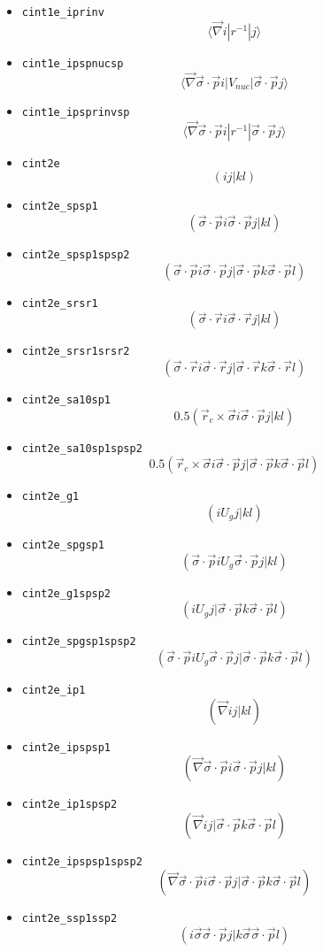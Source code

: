 \documentclass{article}
\begin{document}
\begin{itemize}
\begin{itemize}
  \item
    \verb!cint1e_iprinv! \[\langle \vec{\nabla} i| r^{-1}|j\rangle \]
  \item
    \verb!cint1e_ipspnucsp!
    \[\langle \vec{\nabla} \vec{\sigma}\cdot\vec{p} i| V_{nuc}| \vec{\sigma}\cdot\vec{p}j\rangle \]
  \item
    \verb!cint1e_ipsprinvsp!
    \[\langle \vec{\nabla} \vec{\sigma}\cdot\vec{p} i| r^{-1}| \vec{\sigma}\cdot\vec{p}j\rangle \]
  \item
    \verb!cint2e! \[(ij|kl)\]
  \item
    \verb!cint2e_spsp1!
    \[(\vec{\sigma}\cdot\vec{p} i \vec{\sigma}\cdot\vec{p} j| k l)\]
  \item
    \verb!cint2e_spsp1spsp2!
    \[(\vec{\sigma}\cdot\vec{p} i \vec{\sigma}\cdot\vec{p} j| \vec{\sigma}\cdot\vec{p} k \vec{\sigma}\cdot\vec{p} l)\]
  \item
    \verb!cint2e_srsr1!
    \[(\vec{\sigma}\cdot\vec{r} i \vec{\sigma}\cdot\vec{r} j| kl)\]
  \item
    \verb!cint2e_srsr1srsr2!
    \[(\vec{\sigma}\cdot\vec{r} i \vec{\sigma}\cdot\vec{r} j| \vec{\sigma}\cdot\vec{r} k \vec{\sigma}\cdot\vec{r}l)\]
  \item
    \verb!cint2e_sa10sp1!
    \[0.5 (\vec{r}_c \times\vec{\sigma} i \vec{\sigma}\cdot\vec{p} j| kl)\]
  \item
    \verb!cint2e_sa10sp1spsp2!
    \[0.5 (\vec{r}_c \times\vec{\sigma} i \vec{\sigma}\cdot\vec{p} j| \vec{\sigma}\cdot\vec{p} k \vec{\sigma}\cdot\vec{p} l)\]
  \item
    \verb!cint2e_g1! \[(i U_g j| kl)\]
  \item
    \verb!cint2e_spgsp1!
    \[(\vec{\sigma}\cdot\vec{p} i U_g \vec{\sigma}\cdot\vec{p} j| kl)\]
  \item
    \verb!cint2e_g1spsp2!
    \[(i U_g j| \vec{\sigma}\cdot\vec{p} k \vec{\sigma}\cdot\vec{p}l)\]
  \item
    \verb!cint2e_spgsp1spsp2!
    \[(\vec{\sigma}\cdot\vec{p} i U_g \vec{\sigma}\cdot\vec{p} j| \vec{\sigma}\cdot\vec{p} k \vec{\sigma}\cdot\vec{p}l)\]
  \item
    \verb!cint2e_ip1! \[(\vec{\nabla} i j| kl)\]
  \item
    \verb!cint2e_ipspsp1!
    \[(\vec{\nabla} \vec{\sigma}\cdot\vec{p} i \vec{\sigma}\cdot\vec{p} j| kl)\]
  \item
    \verb!cint2e_ip1spsp2!
    \[(\vec{\nabla} i j| \vec{\sigma}\cdot\vec{p} k \vec{\sigma}\cdot\vec{p}l)\]
  \item
    \verb!cint2e_ipspsp1spsp2!
    \[(\vec{\nabla} \vec{\sigma}\cdot\vec{p} i \vec{\sigma}\cdot\vec{p} j| \vec{\sigma}\cdot\vec{p} k \vec{\sigma}\cdot\vec{p}l)\]
  \item
    \verb!cint2e_ssp1ssp2!
    \[( i \vec{\sigma}\vec{\sigma}\cdot\vec{p} j|k \vec{\sigma}\vec{\sigma}\cdot\vec{p}l)\]
  \end{itemize}
\end{itemize}
\end{document}
